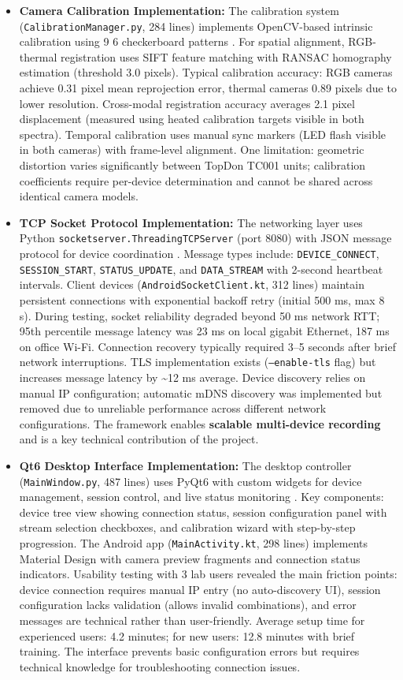\begin{itemize}
    \item \textbf{Camera Calibration Implementation:} The calibration system (\texttt{CalibrationManager.py}, 284 lines) implements OpenCV-based intrinsic calibration using 9\,\texttimes\,6 checkerboard patterns \cite{ref22}. For spatial alignment, RGB-thermal registration uses SIFT feature matching with RANSAC homography estimation (threshold 3.0 pixels). Typical calibration accuracy: RGB cameras achieve 0.31 pixel mean reprojection error, thermal cameras 0.89 pixels due to lower resolution. Cross-modal registration accuracy averages 2.1 pixel displacement (measured using heated calibration targets visible in both spectra). Temporal calibration uses manual sync markers (LED flash visible in both cameras) with frame-level alignment. One limitation: geometric distortion varies significantly between TopDon TC001 units; calibration coefficients require per-device determination and cannot be shared across identical camera models.
    \item \textbf{TCP Socket Protocol Implementation:} The networking layer uses Python \texttt{socketserver.ThreadingTCPServer} (port 8080) with JSON message protocol for device coordination \cite{ref21}. Message types include: \texttt{DEVICE\_CONNECT}, \texttt{SESSION\_START}, \texttt{STATUS\_UPDATE}, and \texttt{DATA\_STREAM} with 2-second heartbeat intervals. Client devices (\texttt{AndroidSocketClient.kt}, 312 lines) maintain persistent connections with exponential backoff retry (initial 500 ms, max 8 s). During testing, socket reliability degraded beyond 50 ms network RTT; 95th percentile message latency was 23 ms on local gigabit Ethernet, 187 ms on office Wi-Fi. Connection recovery typically required 3--5 seconds after brief network interruptions. TLS implementation exists (\texttt{--enable-tls} flag) but increases message latency by \textasciitilde{}12 ms average. Device discovery relies on manual IP configuration; automatic mDNS discovery was implemented but removed due to unreliable performance across different network configurations. The framework enables \textbf{scalable multi-device recording} and is a key technical contribution of the project.
    \item \textbf{Qt6 Desktop Interface Implementation:} The desktop controller (\texttt{MainWindow.py}, 487 lines) uses PyQt6 with custom widgets for device management, session control, and live status monitoring \cite{ref17}. Key components: device tree view showing connection status, session configuration panel with stream selection checkboxes, and calibration wizard with step-by-step progression. The Android app (\texttt{MainActivity.kt}, 298 lines) implements Material Design with camera preview fragments and connection status indicators. Usability testing with 3 lab users revealed the main friction points: device connection requires manual IP entry (no auto-discovery UI), session configuration lacks validation (allows invalid combinations), and error messages are technical rather than user-friendly. Average setup time for experienced users: 4.2 minutes; for new users: 12.8 minutes with brief training. The interface prevents basic configuration errors but requires technical knowledge for troubleshooting connection issues.
\end{itemize}


